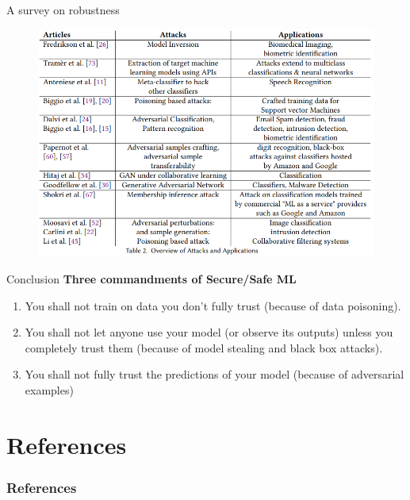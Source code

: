 \documentclass{beamer}
\begin{document}
\begin{frame}{A survey on robustness}
\begin{figure}
    \includegraphics[width=1.\textwidth]{images/robustness_survey.PNG}
    \caption{\cite{chakraborty2018adversarial}}
    \end{figure}
\end{frame}

\begin{frame}{Conclusion}
    \textbf{Three commandments of Secure/Safe ML}
    \begin{enumerate}
        \item You shall not train on data you don’t fully trust
(because of data poisoning). 
\item You shall not let anyone use your model (or observe its
outputs) unless you completely trust them (because of model stealing and black box attacks). 
\item You shall not fully trust the predictions of your model
(because of adversarial examples)
    \end{enumerate}
\end{frame}

\section*{References}
\begin{frame}[allowframebreaks]\small
  \frametitle{References}
  \renewcommand*{\bibfont}{\footnotesize}
  \printbibliography
\end{frame}
\end{document}
